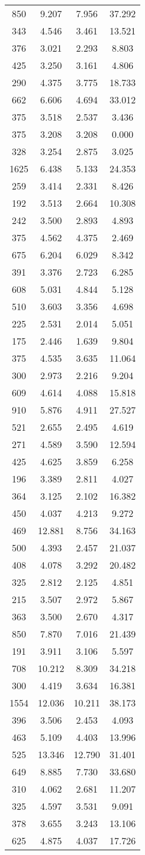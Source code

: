 \begin{longtable}{cccc}
850&9.207&7.956&37.292 \\
343&4.546&3.461&13.521 \\
376&3.021&2.293&8.803 \\
425&3.250&3.161&4.806 \\
290&4.375&3.775&18.733 \\
662&6.606&4.694&33.012 \\
375&3.518&2.537&3.436 \\
375&3.208&3.208&0.000 \\
328&3.254&2.875&3.025 \\
1625&6.438&5.133&24.353 \\
259&3.414&2.331&8.426 \\
192&3.513&2.664&10.308 \\
242&3.500&2.893&4.893 \\
375&4.562&4.375&2.469 \\
675&6.204&6.029&8.342 \\
391&3.376&2.723&6.285 \\
608&5.031&4.844&5.128 \\
510&3.603&3.356&4.698 \\
225&2.531&2.014&5.051 \\
175&2.446&1.639&9.804 \\
375&4.535&3.635&11.064 \\
300&2.973&2.216&9.204 \\
609&4.614&4.088&15.818 \\
910&5.876&4.911&27.527 \\
521&2.655&2.495&4.619 \\
271&4.589&3.590&12.594 \\
425&4.625&3.859&6.258 \\
196&3.389&2.811&4.027 \\
364&3.125&2.102&16.382 \\
450&4.037&4.213&9.272 \\
469&12.881&8.756&34.163 \\
500&4.393&2.457&21.037 \\
408&4.078&3.292&20.482 \\
325&2.812&2.125&4.851 \\
215&3.507&2.972&5.867 \\
363&3.500&2.670&4.317 \\
850&7.870&7.016&21.439 \\
191&3.911&3.106&5.597 \\
708&10.212&8.309&34.218 \\
300&4.419&3.634&16.381 \\
1554&12.036&10.211&38.173 \\
396&3.506&2.453&4.093 \\
463&5.109&4.403&13.996 \\
525&13.346&12.790&31.401 \\
649&8.885&7.730&33.680 \\
310&4.062&2.681&11.207 \\
325&4.597&3.531&9.091 \\
378&3.655&3.243&13.106 \\
625&4.875&4.037&17.726 \\
\hline
\end{longtable}

